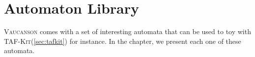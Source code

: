 \documentclass[a4paper]{report}
\newcommand\var[1]{{\ttfamily\itshape #1}}
\newcommand\option[1]{`\texttt{#1}'}
\newcommand{\tafkit}{\textsc{TAF-Kit}\xspace}
\newcommand{\Vauc}{\textsc{Vaucanson}\xspace}
\newenvironment{fnsection}[1]{%
  \renewcommand{\item}[3]{\texttt{##1} \var{##2} & ##3\\}

  \tabularx{\textwidth}{|l|X|}%
    \hline\multicolumn{2}{|c|}{#1} \\\hline%
  }{%
  \endtabularx%
}
\begin{document}



\appendix

\chapter{Automaton Library}

\Vauc comes with a set of interesting automata that can be used to toy
with \tafkit (\autoref{sec:tafkit}) for instance.  In the chapter, we
present each one of these automata.
\end{document}
